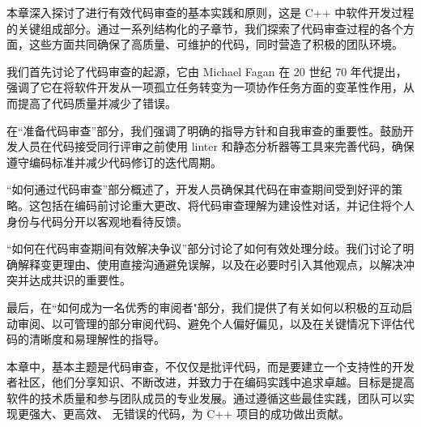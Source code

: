 本章深入探讨了进行有效代码审查的基本实践和原则，这是 C++ 中软件开发过程的关键组成部分。通过一系列结构化的子章节，我们探索了代码审查过程的各个方面，这些方面共同确保了高质量、可维护的代码，同时营造了积极的团队环境。

我们首先讨论了代码审查的起源，它由 Michael Fagan 在 20 世纪 70 年代提出，强调了它在将软件开发从一项孤立任务转变为一项协作任务方面的变革性作用，从而提高了代码质量并减少了错误。

在“准备代码审查”部分，我们强调了明确的指导方针和自我审查的重要性。鼓励开发人员在代码接受同行评审之前使用 linter 和静态分析器等工具来完善代码，确保遵守编码标准并减少代码修订的迭代周期。

“如何通过代码审查”部分概述了，开发人员确保其代码在审查期间受到好评的策略。这包括在编码前讨论重大更改、将代码审查理解为建设性对话，并记住将个人身份与代码分开以客观地看待反馈。

“如何在代码审查期间有效解决争议”部分讨论了如何有效处理分歧。我们讨论了明确解释变更理由、使用直接沟通避免误解，以及在必要时引入其他观点，以解决冲突并达成共识的重要性。

最后，在“如何成为一名优秀的审阅者"部分，我们提供了有关如何以积极的互动启动审阅、以可管理的部分审阅代码、避免个人偏好偏见，以及在关键情况下评估代码的清晰度和易理解性的指导。

本章中，基本主题是代码审查，不仅仅是批评代码，而是要建立一个支持性的开发者社区，他们分享知识、不断改进，并致力于在编码实践中追求卓越。目标是提高软件的技术质量和参与团队成员的专业发展。通过遵循这些最佳实践，团队可以实现更强大、更高效、 无错误的代码，为 C++ 项目的成功做出贡献。
